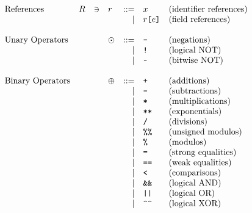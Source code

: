 \[
  \begin{array}{lrclrll}
    \text{References} & \refset &\ni& \refer &
    ::= & \id                                                   & \text{(identifier references)}\\
    &&&&\mid& \refer \C{[} \expr \C{]}                          & \text{(field references)}\\
    \\
    \text{Unary Operators} &&& \uop &
    ::= & \C{-}                                                 & \text{(negations)}\\
    &&&&\mid& \C{!}                                             & \text{(logical NOT)}\\
    &&&&\mid& \C{\char`~}                                       & \text{(bitwise NOT)}\\
    \\
    \text{Binary Operators} &&& \bop &
    ::= & \C{+}                                                 & \text{(additions)}\\
    &&&&\mid& \C{-}                                             & \text{(subtractions)}\\
    &&&&\mid& \C{*}                                             & \text{(multiplications)}\\
    &&&&\mid& \C{**}                                            & \text{(exponentials)}\\
    &&&&\mid& \C{/}                                             & \text{(divisions)}\\
    &&&&\mid& \C{\%\%}                                          & \text{(unsigned modulos)}\\
    &&&&\mid& \C{\%}                                            & \text{(modulos)}\\
    &&&&\mid& \C{=}                                             & \text{(strong equalities)}\\
    &&&&\mid& \C{==}                                            & \text{(weak equalities)}\\
    &&&&\mid& \C{<}                                             & \text{(comparisons)}\\
    &&&&\mid& \C{\&\&}                                          & \text{(logical AND)}\\
    &&&&\mid& \C{||}                                            & \text{(logical OR)}\\
    &&&&\mid& \C{\char`^\char`^}                                & \text{(logical XOR)}\\

\end{array}\]
